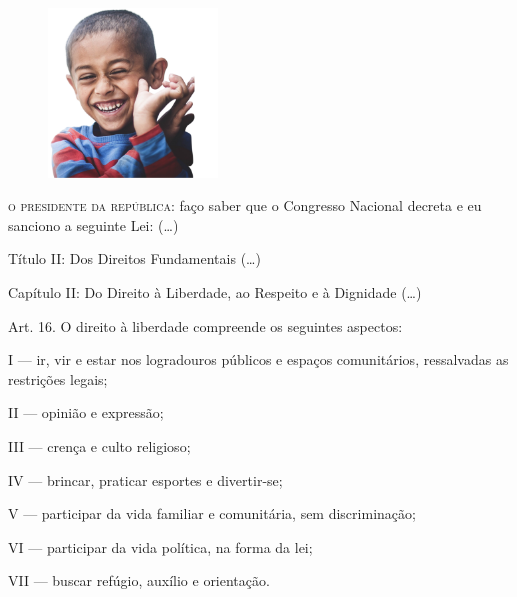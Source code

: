 \begin{myquote}

\begin{figure}  %
  \centering
  \includegraphics[width=0.4\textwidth]{./imgSAEB_7_POR/media/image33.png}
\end{figure}

\textsc{o presidente da república}: faço saber que o Congresso Nacional decreta e
eu sanciono a seguinte Lei: (\ldots{})

Título II: Dos Direitos Fundamentais (\ldots{})

Capítulo II: Do Direito à Liberdade, ao Respeito e à Dignidade (\ldots{})

Art. 16. O direito à liberdade compreende os seguintes aspectos:

I --- ir, vir e estar nos logradouros públicos e espaços comunitários,
ressalvadas as restrições legais;

II --- opinião e expressão;

III --- crença e culto religioso;

IV --- brincar, praticar esportes e divertir-se;

V --- participar da vida familiar e comunitária, sem discriminação;

VI --- participar da vida política, na forma da lei;

VII --- buscar refúgio, auxílio e orientação. \\


\end{myquote}

